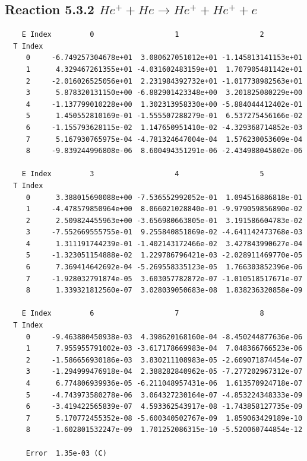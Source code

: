 \documentclass[12pt,dvipdfmx]{article}
\begin{document}
\newpage
\subsection{
Reaction 5.3.2 $   He^+ + He \rightarrow He^+ + He^+ + e$}


\begin{small}\begin{verbatim}
    E Index         0                   1                   2
  T Index
     0     -6.749257304678e+01  3.080627051012e+01 -1.145813141153e+01
     1      4.329467261355e+01 -4.031602483159e+01  1.707905481142e+01
     2     -2.016026525056e+01  2.231984392732e+01 -1.017738982563e+01
     3      5.878320131150e+00 -6.882901423348e+00  3.201825080229e+00
     4     -1.137799010228e+00  1.302313958330e+00 -5.884044412402e-01
     5      1.450552810169e-01 -1.555507288279e-01  6.537275456166e-02
     6     -1.155793628115e-02  1.147650951410e-02 -4.329368714852e-03
     7      5.167930765975e-04 -4.781324647004e-04  1.576230053609e-04
     8     -9.839244996808e-06  8.600494351291e-06 -2.434988045802e-06

    E Index         3                   4                   5
  T Index
     0      3.388015690088e+00 -7.536552992052e-01  1.094516886818e-01
     1     -4.478579850964e+00  8.066021028840e-01 -9.979059856890e-02
     2      2.509824455963e+00 -3.656980663805e-01  3.191586604783e-02
     3     -7.552669555755e-01  9.255840851869e-02 -4.641142473768e-03
     4      1.311191744239e-01 -1.402143172466e-02  3.427843990627e-04
     5     -1.323051154888e-02  1.229786796421e-03 -2.028911469770e-05
     6      7.369414642692e-04 -5.269558335123e-05  1.766303852396e-06
     7     -1.928032791874e-05  3.603057782872e-07 -1.010518517671e-07
     8      1.339321812560e-07  3.028039050683e-08  1.838236320858e-09

    E Index         6                   7                   8
  T Index
     0     -9.463880450938e-03  4.398620168160e-04 -8.450244877636e-06
     1      7.955955791002e-03 -3.617178669983e-04  7.048366766523e-06
     2     -1.586656930186e-03  3.830211108983e-05 -2.609071874454e-07
     3     -1.294999476918e-04  2.388282840962e-05 -7.277202967312e-07
     4      6.774806939936e-05 -6.211048957431e-06  1.613570924718e-07
     5     -4.743973580278e-06  3.064327230164e-07 -4.853224348333e-09
     6     -3.419422565839e-07  4.593362543917e-08 -1.743858127735e-09
     7      5.170772455352e-08 -5.600340502767e-09  1.859063429189e-10
     8     -1.602801532247e-09  1.701252086315e-10 -5.520060744854e-12

     Error  1.35e-03 (C)
\end{verbatim}\end{small}
\end{document}
